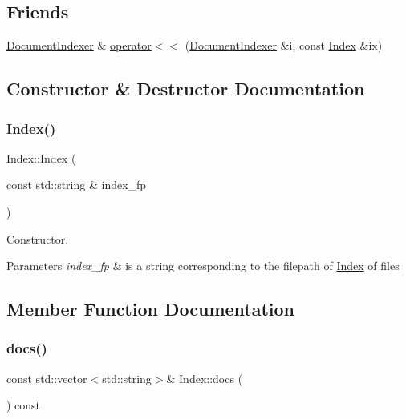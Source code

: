 \subsection*{Friends}
\begin{DoxyCompactItemize}
\item 
\hyperlink{class_document_indexer}{Document\+Indexer} \& \hyperlink{class_index_a82199a005a825421b7db05a3c2547180}{operator$<$$<$} (\hyperlink{class_document_indexer}{Document\+Indexer} \&i, const \hyperlink{class_index}{Index} \&ix)
\end{DoxyCompactItemize}


\subsection{Constructor \& Destructor Documentation}
\mbox{\label{class_index_aa9d4e7751fa8bdd7452858f641d8c912}} 
\subsubsection{\texorpdfstring{Index()}{Index()}}
{\footnotesize\ttfamily Index\+::\+Index (\begin{DoxyParamCaption}\item[{const std\+::string \&}]{index\+\_\+fp }\end{DoxyParamCaption})\hspace{0.3cm}{\ttfamily [explicit]}}



Constructor. 


\begin{DoxyParams}{Parameters}
{\em index\+\_\+fp} & is a string corresponding to the filepath of \hyperlink{class_index}{Index} of files \\
\hline
\end{DoxyParams}


\subsection{Member Function Documentation}
\mbox{\label{class_index_a6d6dfe2b2a058065c9e62d4f6c285a48}} 
\subsubsection{\texorpdfstring{docs()}{docs()}}
{\footnotesize\ttfamily const std\+::vector$<$std\+::string$>$\& Index\+::docs (\begin{DoxyParamCaption}{ }\end{DoxyParamCaption}) const\hspace{0.3cm}{\ttfamily [inline]}}



